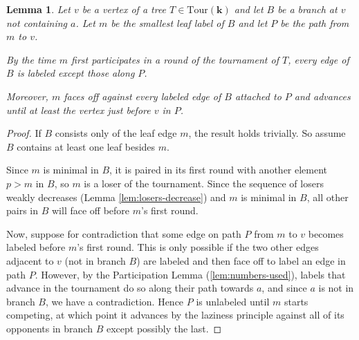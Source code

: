 \documentclass[11pt]{amsart}
\newcommand{\Tour}{\mathrm{Tour}}
\newtheorem{lemma}[thm]{Lemma}
\numberwithin{thm}{section}
\numberwithin{equation}{section}
\numberwithin{figure}{section}
\theoremstyle{definition}
\begin{document}
\begin{lemma}\label{lem:branch-path}
Let $v$ be a vertex of a tree $T \in \Tour(\mathbf{k})$ and let $B$ be a branch at $v$ not containing $a$. Let $m$ be the smallest leaf label of $B$ and let $P$ be the path from $m$ to $v$. 

By the time $m$ first participates in a round of the tournament of $T$, every edge of $B$ is labeled except those along $P$.

Moreover, $m$ faces off against every labeled edge of $B$ attached to $P$ and advances until at least the vertex just before $v$ in $P$.
\end{lemma}

\begin{proof}
If $B$ consists only of the leaf edge $m$, the result holds trivially.  So assume $B$ contains at least one leaf besides $m$. 

Since $m$ is minimal in $B$, it is paired in its first round with another element $p>m$ in $B$, so $m$ is a loser of the tournament.  Since the sequence of losers weakly decreases (Lemma \ref{lem:losers-decrease}) and $m$ is minimal in $B$, all other pairs in $B$ will face off before $m$'s first round.  

Now, suppose for contradiction that some edge on path $P$ from $m$ to $v$ becomes labeled before $m$'s first round.  This is only possible if the two other edges adjacent to $v$ (not in branch $B$) are labeled and then face off to label an edge in path $P$.  However, by the Participation Lemma (\ref{lem:numbers-used}), labels that advance in the tournament do so along their path towards $a$, and since $a$ is not in branch $B$, we have a contradiction.  Hence $P$ is unlabeled until $m$ starts competing, at which point it advances by the laziness principle against all of its opponents in branch $B$ except possibly the last.
\end{proof}
\end{document}
